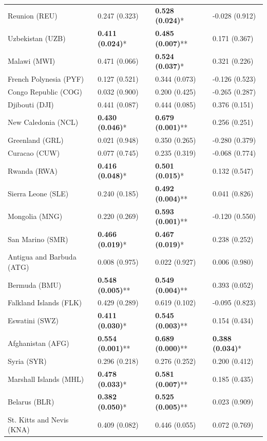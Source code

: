 \begin{longtable}{p{4cm}p{3cm}p{3cm}p{3cm}}
Reunion (REU) & 0.247 (0.323) & \textbf{0.528 (0.024)}* & -0.028 (0.912) \\
Uzbekistan (UZB) & \textbf{0.411 (0.024)}* & \textbf{0.485 (0.007)}** & 0.171 (0.367) \\
Malawi (MWI) & 0.471 (0.066) & \textbf{0.524 (0.037)}* & 0.321 (0.226) \\
French Polynesia (PYF) & 0.127 (0.521) & 0.344 (0.073) & -0.126 (0.523) \\
Congo Republic (COG) & 0.032 (0.900) & 0.200 (0.425) & -0.265 (0.287) \\
Djibouti (DJI) & 0.441 (0.087) & 0.444 (0.085) & 0.376 (0.151) \\
New Caledonia (NCL) & \textbf{0.430 (0.046)}* & \textbf{0.679 (0.001)}** & 0.256 (0.251) \\
Greenland (GRL) & 0.021 (0.948) & 0.350 (0.265) & -0.280 (0.379) \\
Curacao (CUW) & 0.077 (0.745) & 0.235 (0.319) & -0.068 (0.774) \\
Rwanda (RWA) & \textbf{0.416 (0.048)}* & \textbf{0.501 (0.015)}* & 0.132 (0.547) \\
Sierra Leone (SLE) & 0.240 (0.185) & \textbf{0.492 (0.004)}** & 0.041 (0.826) \\
Mongolia (MNG) & 0.220 (0.269) & \textbf{0.593 (0.001)}** & -0.120 (0.550) \\
San Marino (SMR) & \textbf{0.466 (0.019)}* & \textbf{0.467 (0.019)}* & 0.238 (0.252) \\
Antigua and Barbuda (ATG) & 0.008 (0.975) & 0.022 (0.927) & 0.006 (0.980) \\
Bermuda (BMU) & \textbf{0.548 (0.005)}** & \textbf{0.549 (0.004)}** & 0.393 (0.052) \\
Falkland Islands (FLK) & 0.429 (0.289) & 0.619 (0.102) & -0.095 (0.823) \\
Eswatini (SWZ) & \textbf{0.411 (0.030)}* & \textbf{0.545 (0.003)}** & 0.154 (0.434) \\
Afghanistan (AFG) & \textbf{0.554 (0.001)}** & \textbf{0.689 (0.000)}** & \textbf{0.388 (0.034)}* \\
Syria (SYR) & 0.296 (0.218) & 0.276 (0.252) & 0.200 (0.412) \\
Marshall Islands (MHL) & \textbf{0.478 (0.033)}* & \textbf{0.581 (0.007)}** & 0.185 (0.435) \\
Belarus (BLR) & \textbf{0.382 (0.050)}* & \textbf{0.525 (0.005)}** & 0.023 (0.909) \\
St. Kitts and Nevis (KNA) & 0.409 (0.082) & 0.446 (0.055) & 0.072 (0.769) \\

\end{longtable}
